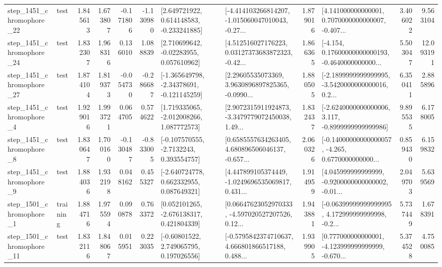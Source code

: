 \begin{tabular}{llrrrrllrlrr}
 step\_1451\_chromophore\_22 &      test &      1.845613 &    1.673807 &     -0.171806 & -1.130980 &    [2.649721922, 0.614148583, -0.233241885] &  [-4.414103266814207, -1.015060047010043, -0.27... &       1.879016 &  [4.141000000000001, 0.7070000000000007, -0.407... &            3.406022 &          9.563104 \\
 step\_1451\_chromophore\_24 &      test &      1.832307 &    1.968316 &      0.136010 &  1.088839 &     [2.710699642, -0.02283955, 0.057610962] &  [4.512516027176223, 0.03127373683872323, -0.42... &       1.866365 &  [-4.154, 0.17600000000000193, -0.4640000000000... &            5.503047 &         12.093191 \\
 step\_1451\_chromophore\_27 &      test &      1.874104 &    1.819373 &     -0.054730 & -0.286687 &   [-1.365649798, -2.34378691, -0.121145259] &  [2.29605535073369, 3.9630896897825365, -0.0990... &       1.880505 &  [-2.1899999999999995, -3.5420000000000016, 0.2... &            6.350411 &          2.885896 \\
  step\_1451\_chromophore\_4 &      test &      1.929016 &    1.993721 &      0.064705 &  0.574622 &    [1.719335065, -2.012008266, 1.087772573] &  [2.9072315911924873, -3.3479779072450038, 1.49... &       1.832437 &  [-2.6240000000000006, 3.117, -0.8999999999999986] &            9.895535 &          6.178005 \\
  step\_1451\_chromophore\_8 &      test &      1.830647 &    1.700160 &     -0.130487 & -0.833005 &     [-0.107570555, -2.7132243, 0.393554757] &  [0.6585557634263405, 4.680896506046137, -0.657... &       2.060326 &  [-0.14000000000000057, -4.265, 0.6770000000000... &            0.859430 &          6.159832 \\
  step\_1451\_chromophore\_9 &      test &      1.884036 &    1.932198 &      0.048162 &  0.455327 &    [-2.640724778, 0.662332955, 0.087649321] &  [4.447899105374449, -1.0249696535069817, 0.431... &       1.914959 &  [4.045999999999999, -0.9200000000000002, -0.01... &            2.049703 &          5.639569 \\
  step\_1501\_chromophore\_1 &  training &      1.884716 &    1.975594 &      0.090878 &  0.763372 &    [0.052101265, -2.676138317, 0.421804339] &  [0.06647623052970333, -4.597020527207526, 0.12... &       1.943881 &  [-0.06399999999999995, 4.172999999999998, -0.2... &            5.737449 &          1.678391 \\
 step\_1501\_chromophore\_11 &      test &      1.832116 &    1.848067 &      0.015951 &  0.223035 &     [-0.60801522, 2.749065795, 0.197026556] &  [-0.5795842374710637, 4.666801866517188, 0.488... &       1.939905 &  [0.777000000000001, -4.123999999999999, -0.670... &            5.374528 &          4.750085 \\

\end{tabular}
